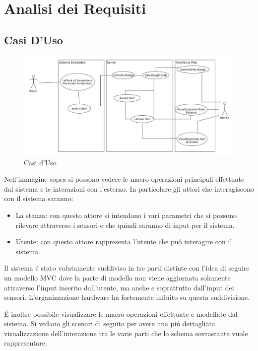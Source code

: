 \section{Analisi dei Requisiti}
\subsection{Casi D'Uso}

\begin{figure}[ht]
\centering
\includegraphics[width=\textwidth]{Figures/UseCases}
\caption{Casi d'Uso}
\end{figure}

Nell'immagine sopra si possono vedere le macro operazioni principali effettuate dal sistema e le interazioni con l'esterno. In particolare gli attori che interagiscono con il sistema saranno:

\begin{itemize}
  \item La stanza: con questo attore si intendono i vari parametri che si possono rilevare attraverso i sensori e che quindi saranno di input per il sistema.
  \item Utente: con questo attore rappresenta l'utente che pu\'o interagire con il sistema.
\end{itemize}

Il sistema \'e stato volutamente suddiviso in tre parti distinte con l'idea di seguire un modello MVC dove la parte di modello non viene aggiornata solamente attraverso l'input inserito dall'utente, ma anche e soprattutto dall'input dei sensori. L'organizzazione hardware ha fortemente influito su questa suddivisione.

\'E inoltre possibile visualizzare le macro operazioni effettuate e modellate dal sistema. Si vedano gli scenari di seguito per avere una pi\'u dettagliata visualizzazione dell'interazione tra le varie parti che lo schema sovrastante vuole rappresentare.



